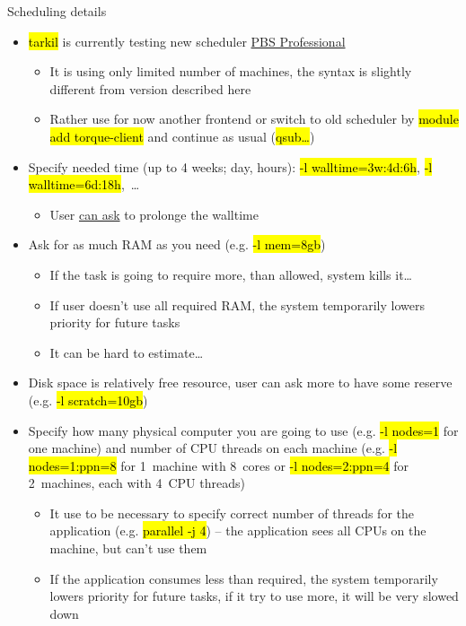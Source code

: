 \documentclass[compress, ucs, xelatex, 11pt, xcolor=svgnames,
  hyperref={
    bookmarks=true,
    unicode=true,
    colorlinks=true,
    pdftitle={Linux, command line and MetaCentrum},
    plainpages=false,
    pdfauthor={Vojtech Zeisek},
    pdfsubject={Course about use of Linux command line, writing shell scripts and using MetaCentrum of CESNET},
    pdfcreator={XeLaTeX},
    pdfkeywords={Linux, GNU, BASH, shell, command line, MetaCentrum},
    linkcolor=DarkRed,
    anchorcolor=DarkBlue,
    citecolor=Indigo,
    filecolor=NavyBlue,
    menucolor=DarkMagenta,
    urlcolor=DarkBlue,
    pdftex},
  url={hyphens, lowtilde} %
  ]{beamer}
\renewcommand{\texttt}[1]{\hl{\ttfamily #1}}
\begin{document}
\begin{frame}[allowframebreaks]{Scheduling details}
  \begin{itemize}
    \item \texttt{tarkil} is currently testing new scheduler \href{https://wiki.metacentrum.cz/wiki/PBS_Professional}{PBS Professional}
    \begin{itemize}
      \item It is using only limited number of machines, the syntax is slightly different from version described here
      \item Rather use for now another frontend or switch to old scheduler by \texttt{module add torque-client} and continue as usual (\texttt{qsub\ldots})
    \end{itemize}
    \item Specify needed time (up to 4 weeks; day, hours): \texttt{-l walltime=3w:4d:6h}, \texttt{-l walltime=6d:18h},~\ldots
    \begin{itemize}
      \item User \href{mailto:meta@cesnet.cz}{can ask} to prolonge the walltime
    \end{itemize}
    \item Ask for as much RAM as you need (e.g. \texttt{-l mem=8gb})
    \begin{itemize}
      \item If the task is going to require more, than allowed, system kills it\ldots
      \item If user doesn't use all required RAM, the system temporarily lowers priority for future tasks
      \item It can be hard to estimate\ldots
    \end{itemize}
    \item Disk space is relatively free resource, user can ask more to have some reserve (e.g. \texttt{-l scratch=10gb})
    \item Specify how many physical computer you are going to use (e.g. \texttt{-l nodes=1} for one machine) and number of CPU threads on each machine (e.g. \texttt{-l nodes=1:ppn=8} for 1~machine with 8~cores or \texttt{-l nodes=2:ppn=4} for 2~machines, each with 4~CPU threads)
    \begin{itemize}
      \item It use to be necessary to specify correct number of threads for the application (e.g. \texttt{parallel -j 4}) -- the application sees all CPUs on the machine, but can't use them
      \item If the application consumes less than required, the system temporarily lowers priority for future tasks, if it try to use more, it will be very slowed down

\end{itemize}
\end{itemize}
\end{frame}
\end{document}
